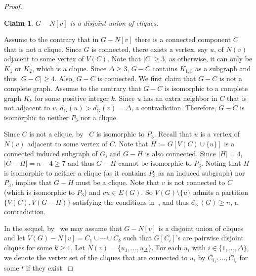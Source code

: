 \documentclass[a4paper,12pt]{article}
\theoremstyle{plain}
\newtheorem{claim}{Claim}[section]
\newenvironment{proof*}{\noindent \emph{Proof of the claim.}}{\hfill$\Diamond$}
\begin{document}
\begin{proof}
\begin{claim}\label{claim:G-N[v]isUnionOfCliques}
$G-N[v]$ is a disjoint union of cliques. 
\end{claim}

\begin{proof*}
Assume to the contrary that in $G-N[v]$ there is a connected component $C$ that is not a clique. Since $G$ is connected, there exists a vertex, say $u$, of $N(v)$ adjacent to some vertex of $V(C)$. Note that $|C|\geq 3$, as otherwise, it can only be $K_1$ or $K_2$, which is a clique. Since $\Delta \geq 3$, $G-C$ contains $K_{1,3}$ as a subgraph and thus $|G-C|\geq 4$. Also, $G-C$ is connected. We first claim that $G-C$ is not a complete graph. Assume to the contrary that $G-C$ is isomorphic to a complete graph $K_k$ for some positive integer $k$. Since $u$ has an extra neighbor in $C$ that is not adjacent to $v$, $d_G(u)>d_G(v)=\Delta$, a contradiction. Therefore, $G-C$ is isomorphic to neither $P_3$ nor a clique.

Since $C$ is not a clique, by~ $C$ is isomorphic to $P_3$. Recall that $u$ is a vertex of $N(v)$ adjacent to some vertex of $C$. Note that $H:=G[V(C)\cup \{u\}]$ is a connected induced subgraph of $G$, and $G-H$ is also connected. Since $|H|=4$,  $|G-H|=n-4\geq 7$ and thus $G-H$ cannot be isomorphic to $P_3$. Noting that $H$ is isomorphic to neither a clique (as it contains $P_3$ as an induced subgraph) nor $P_3$,  implies that $G-H$ must be a clique. Note that $v$ is not connected to $C$ (which is isomorphic to $P_3$) and $vu\in E(G)$. So $V(G)\setminus \{u\}$ admits a partition $\{V(C), V(G-H)\}$ satisfying the conditions in~, and thus $\mathcal{E}_3^{-}(G) \geq n$, a contradiction. 
\end{proof*}



\medskip
In the sequel, by~ we may assume that $G - N[v]$ is a disjoint union of cliques and let $V(G)-N[v]=C_1\cup \cdots \cup C_k$ such that $G[C_i]$'s are pairwise disjoint cliques for some $k\geq 1$. Let $N(v)=\{u_1, \ldots, u_{\Delta}\}$. For each $u_i$ with $i\in \{1,\ldots, \Delta\}$, we denote the vertex set of the cliques that are connected to $u_i$ by $C_{i_1}, \ldots, C_{i_t}$ for some $t$ if they exist.



\end{proof}
\end{document}
